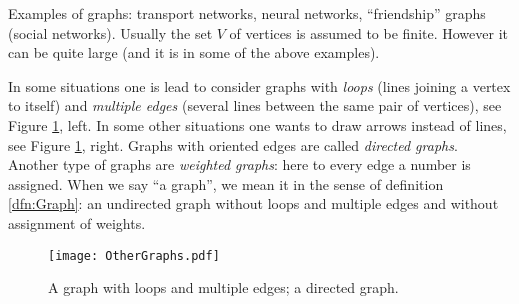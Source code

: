 
Examples of graphs: transport networks, neural networks, ``friendship'' graphs (social networks).
Usually the set $V$ of vertices is assumed to be finite.
However it can be quite large (and it is in some of the above examples).

In some situations one is lead to consider graphs with \emph{loops} (lines joining a vertex to itself)
and \emph{multiple edges} (several lines between the same pair of vertices), see Figure \ref{fig:OtherGraphs}, left.
In some other situations one wants to draw arrows instead of lines, see Figure \ref{fig:OtherGraphs}, right.
Graphs with oriented edges are called \emph{directed graphs}.
Another type of graphs are \emph{weighted graphs}: here to every edge a number is assigned.
When we say ``a graph'', we mean it in the sense of definition \ref{dfn:Graph}: an undirected graph without loops and multiple edges
and without assignment of weights.

\begin{figure}[ht]
\begin{center}
\texttt{[image: OtherGraphs.pdf]}
\end{center}
\caption{A graph with loops and multiple edges; a directed graph.}
\label{fig:OtherGraphs}
\end{figure}

